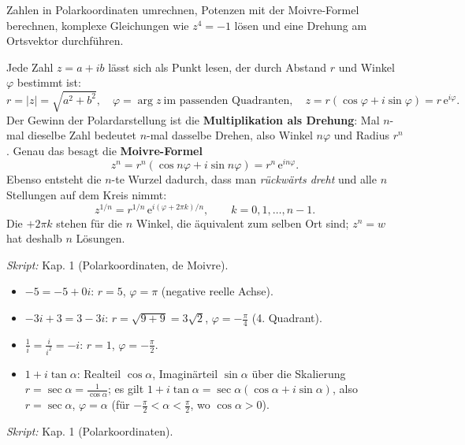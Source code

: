 

Zahlen in Polarkoordinaten umrechnen, Potenzen mit der Moivre-Formel
berechnen, komplexe Gleichungen wie $z^4=-1$ lösen und eine Drehung am
Ortsvektor durchführen.

\begin{werkzeugkasten}
Jede Zahl $z=a+ib$ lässt sich als Punkt lesen, der durch Abstand $r$ und
Winkel $\varphi$ bestimmt ist:
\begin{equation*}
  r=|z|=\sqrt{a^2+b^2},\quad
  \varphi=\arg z \ \text{im passenden Quadranten},\quad
  z=r(\cos\varphi+i\sin\varphi)=r\,\mathrm e^{i\varphi}.
\end{equation*}
Der Gewinn der Polardarstellung ist die \textbf{Multiplikation als
Drehung}: Mal $n$-mal dieselbe Zahl bedeutet $n$-mal dasselbe Drehen, also
Winkel $n\varphi$ und Radius $r^n$. Genau das besagt die
\textbf{Moivre-Formel}
\begin{equation*}
  z^n=r^n(\cos n\varphi+i\sin n\varphi)=r^n\,\mathrm e^{in\varphi}.
\end{equation*}
Ebenso entsteht die $n$-te Wurzel dadurch, dass man \emph{rückwärts dreht}
und alle $n$ Stellungen auf dem Kreis nimmt:
\begin{equation*}
  z^{1/n}=r^{1/n}\,\mathrm e^{i(\varphi+2\pi k)/n},\qquad k=0,1,\ldots,n-1 .
\end{equation*}
Die $+2\pi k$ stehen für die $n$ Winkel, die äquivalent zum selben Ort
sind; $z^n=w$ hat deshalb $n$ Lösungen.

\textit{Skript:} Kap. 1 (Polarkoordinaten, de Moivre).
\end{werkzeugkasten}

\begin{werkzeugkasten}
\begin{itemize}
  \item $-5=-5+0i$: $r=5$, $\varphi=\pi$ (negative reelle Achse).
  \item $-3i+3=3-3i$: $r=\sqrt{9+9}=3\sqrt2$, $\varphi=-\tfrac\pi4$ (4.
        Quadrant).
  \item $\frac1i=\frac{i}{i^2}=-i$: $r=1$, $\varphi=-\tfrac\pi2$.
  \item $1+i\tan\alpha$: Realteil $\cos\alpha$, Imaginärteil $\sin\alpha$
        über die Skalierung $r=\sec\alpha=\frac1{\cos\alpha}$; es gilt
        $1+i\tan\alpha=\sec\alpha(\cos\alpha+i\sin\alpha)$, also
        $r=\sec\alpha$, $\varphi=\alpha$ (für $-\tfrac\pi2<\alpha<
        \tfrac\pi2$, wo $\cos\alpha>0$).
\end{itemize}
\textit{Skript:} Kap. 1 (Polarkoordinaten).
\end{werkzeugkasten}

